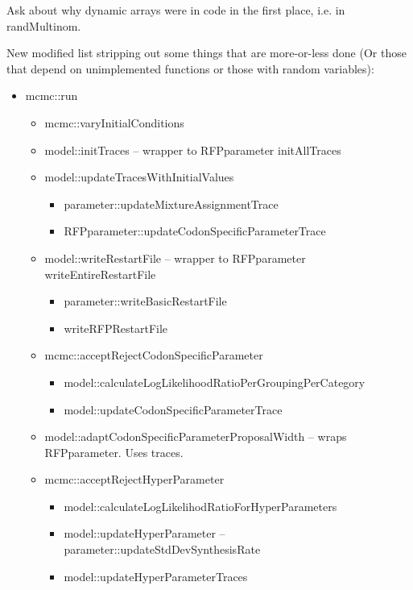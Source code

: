 \documentclass[12pt,hyperref]{labbook}
\newcommand{\sep}{\discretionary{}{}{}} %
\begin{document}
Ask about why dynamic arrays were in code in the first place, i.e. in randMultinom.

New modified list stripping out some things that are more-or-less done
(Or those that depend on unimplemented functions or those with random variables):
\begin{itemize}
    \item mcmc::run
    \begin{itemize}
        \item mcmc::varyInitialConditions
        \item model::initTraces -- wrapper to RFPparameter initAllTraces
        \item model::updateTracesWithInitialValues
        \begin{itemize}
            \item parameter::updateMixtureAssignmentTrace
            \item RFPparameter::updateCodonSpecificParameterTrace
        \end{itemize}
        \item model::writeRestartFile -- wrapper to RFPparameter writeEntireRestartFile
        \begin{itemize}
            \item parameter::writeBasicRestartFile
            \item writeRFPRestartFile
        \end{itemize}
        \item mcmc::acceptRejectCodonSpecificParameter
        \begin{itemize}
            \item model::calculateLogLikelihoodRatioPerGroupingPerCategory
            \item model::updateCodonSpecificParameterTrace
        \end{itemize}
        \item model::\sep adapt\sep Codon\sep Specific\sep Parameter\sep Proposal\sep Width --
        wraps RFP\sep parameter. Uses traces.
        \item mcmc::acceptRejectHyperParameter
        \begin{itemize}
            \item model::calculateLogLikelihodRatioForHyperParameters
            \item model::updateHyperParameter -- parameter::updateStdDevSynthesisRate
            \item model::updateHyperParameterTraces
        \end{itemize}

\end{itemize}
\end{itemize}
\end{document}
